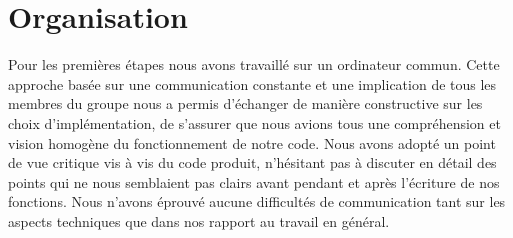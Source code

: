 \documentclass[11pt]{article}
\begin{document}
\section{Organisation}
Pour les premières étapes nous avons travaillé sur un ordinateur commun.
Cette approche basée sur une communication constante et une implication de tous les membres du groupe
nous a permis d'échanger de manière constructive sur les choix d'implémentation, de s'assurer que
nous avions tous une compréhension et vision homogène du fonctionnement de notre code. Nous
avons adopté un point de vue critique vis à vis du code produit,
n'hésitant pas à discuter en détail des points qui ne nous semblaient pas clairs
avant pendant et après l'écriture de nos fonctions. Nous n'avons éprouvé aucune difficultés de communication
tant sur les aspects techniques que dans nos rapport au travail en général.
\end{document}

